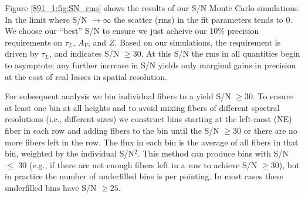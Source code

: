 %
% 
% 
% 
% 
% 
%  
%

Figure \ref{891_1:fig:SN_rms} shows the results of our S/N Monte Carlo
simulations. In the limit where S/N $\rightarrow\infty$ the scatter
(rms) in the fit parameters tends to 0.  We choose our ``best'' S/N to
ensure we just acheive our 10\% precision requirements on $\tau_L$,
$A_V$, and $Z$.  Based on our simulations, the requirement is driven
by $\tau_L$, and indicates S/N $\geq 30$.  At this S/N the rms in all
quantities begin to asymptote; any further increase in S/N yields only
marginal gains in precision at the cost of real losses in spatial
resolution.

For subsequent analysis we bin individual \GP fibers to a yield S/N
$\geq 30$. To ensure at least one bin at all heights and to avoid
mixing fibers of different spectral resolutions (i.e., different
sizes) we construct bins starting at the left-most (NE) fiber in each
row and adding fibers to the bin until the S/N $\geq 30$ or there are
no more fibers left in the row. The flux in each bin is the average of
all fibers in that bin, weighted by the individual S/N$^2$. This
method can produce bins with S/N $\leq$ 30 (e.g., if there are not
enough fibers left in a row to achieve S/N $\geq 30$), but in practice
the number of underfilled bins is  per pointing. In most cases
these underfilled bins have S/N $\geq 25$.

